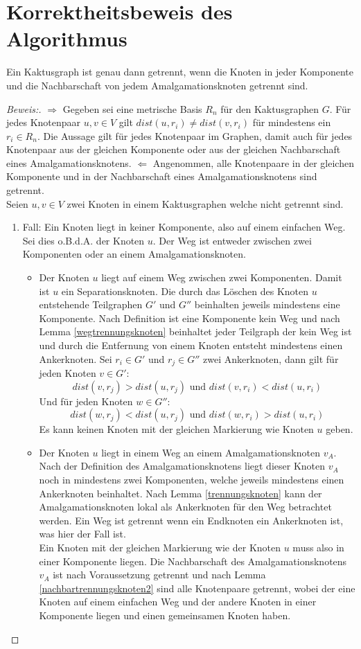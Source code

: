 \section{Korrektheitsbeweis des Algorithmus}
\begin{lem}
Ein Kaktusgraph ist genau dann getrennt, wenn die Knoten in jeder Komponente und die Nachbarschaft von jedem Amalgamationsknoten getrennt sind.  
\end{lem}
\begin{proof}[Beweis:]
$\Longrightarrow$ Gegeben sei eine metrische Basis $R_n$ für den Kaktusgraphen $G$. Für jedes Knotenpaar $u,v \in V$ gilt $dist(u,r_i)\neq dist(v,r_i)$ für mindestens ein $r_i \in R_n$. Die Aussage gilt für jedes Knotenpaar im Graphen, damit auch für jedes Knotenpaar aus der gleichen Komponente oder aus der gleichen Nachbarschaft eines Amalgamationsknotens.\newline
$\Longleftarrow$ Angenommen, alle Knotenpaare in der gleichen Komponente und in der Nachbarschaft eines Amalgamationsknotens sind getrennt.\\
Seien $u,v \in V$ zwei Knoten in einem Kaktusgraphen welche nicht getrennt sind.
\begin{enumerate}
\item Fall: Ein Knoten liegt in keiner Komponente, also auf einem einfachen Weg. Sei dies o.B.d.A. der Knoten $u$. Der Weg ist entweder zwischen zwei Komponenten oder an einem Amalgamationsknoten.
\begin{itemize}
\item Der Knoten $u$ liegt auf einem Weg zwischen zwei Komponenten. Damit ist $u$ ein Separationsknoten. Die durch das Löschen des Knoten $u$ entstehende Teilgraphen $G'$ und $G''$ beinhalten jeweils mindestens eine Komponente. Nach Definition ist eine Komponente kein Weg und nach Lemma \ref{wegtrennungsknoten} beinhaltet jeder Teilgraph der kein Weg ist und durch die Entfernung von einem Knoten entsteht mindestens einen Ankerknoten. Sei $r_i \in G'$ und $r_j \in G''$ zwei Ankerknoten, dann gilt für jeden Knoten $v \in G'$:
$$ dist(v,r_j)>dist(u,r_j)\text{ und } dist(v,r_i)<dist(u,r_i)$$
Und für jeden Knoten $w \in G'' $:
$$ dist(w,r_j)<dist(u,r_j)\text{ und } dist(w,r_i)>dist(u,r_i)$$
Es kann keinen Knoten mit der gleichen Markierung wie Knoten $u$ geben.
\item Der Knoten $u$ liegt in einem Weg an einem Amalgamationsknoten $v_A$. Nach der Definition des Amalgamationsknotens liegt dieser Knoten $v_A$ noch in mindestens zwei Komponenten, welche jeweils mindestens einen Ankerknoten beinhaltet. Nach Lemma \ref{trennungsknoten} kann der Amalgamationsknoten lokal als Ankerknoten für den Weg betrachtet werden. Ein Weg ist getrennt wenn ein Endknoten ein Ankerknoten ist, was hier der Fall ist.\\Ein Knoten mit der gleichen Markierung wie der Knoten $u$ muss also in einer Komponente liegen. Die Nachbarschaft des Amalgamationsknotens $v_A$ ist nach Voraussetzung getrennt und nach Lemma \ref{nachbartrennungsknoten2} sind alle Knotenpaare getrennt, wobei der eine Knoten auf einem einfachen Weg und der andere Knoten in einer Komponente liegen und einen gemeinsamen Knoten haben.  

\end{itemize}
\end{enumerate}
\end{proof}

